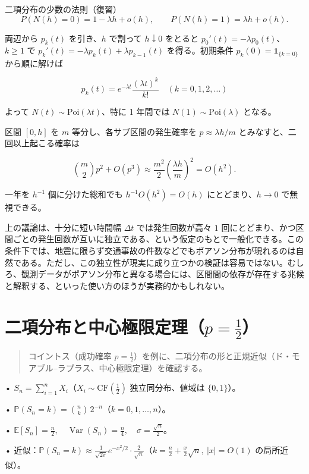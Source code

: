 \documentclass[uplatex,dvipdfmx,11pt,a4paper,openany]{bxjsbook}
\newenvironment{leadparagraph}{\begin{quote}\large\color{ColumnInk}}{\end{quote}}
\newcommand{\columnheading}[1]{\par\medskip{\large\color{ColumnInk}#1}\par\smallskip}
\begin{document}
\begin{columnbox}{二項分布の少数の法則（復習）}
\[P(N(h)=0)=1-\lambda h+o(h),\qquad P(N(h)=1)=\lambda h+o(h).\]

両辺から $p_k(t)$ を引き、$h$ で割って $h\downarrow 0$ をとると
        $p_0'(t)=-\lambda p_0(t)$、$k\ge 1$ で
        $p_k'(t)=-\lambda p_k(t)+\lambda p_{k-1}(t)$ を得る。初期条件 $p_k(0)=\mathbf{1}_{\{k=0\}}$ から順に解けば

\[p_k(t)=e^{-\lambda t}\frac{(\lambda t)^k}{k!}\quad(k=0,1,2,\dots)\]

よって $N(t)\sim \mathrm{Poi}(\lambda t)$、特に 1 年間では $N(1)\sim \mathrm{Poi}(\lambda)$ となる。

\columnheading{$P(N(h)\ge 2)=o(h)$ とおく直観}
区間 $[0,h]$ を $m$ 等分し、各サブ区間の発生確率を $p\approx \lambda h/m$ とみなすと、二回以上起こる確率は

\[\binom{m}{2}p^2+O(p^3)\approx \frac{m^2}{2}\left(\frac{\lambda h}{m}\right)^2=O(h^2).\]

一年を $h^{-1}$ 個に分けた総和でも $h^{-1}O(h^2)=O(h)$ にとどまり、$h\to 0$ で無視できる。

\columnheading{まとめ}
上の議論は、十分に短い時間幅 $\Delta t$ では発生回数が高々 $1$ 回にとどまり、かつ区間ごとの発生回数が互いに独立である、という仮定のもとで一般化できる。この条件下では、地震に限らず交通事故の件数などでもポアソン分布が現れるのは自然である。ただし、この独立性が現実に成り立つかの検証は容易ではない。むしろ、観測データがポアソン分布と異なる場合には、区間間の依存が存在する兆候と解釈する、といった使い方のほうが実務的かもしれない。

\end{columnbox}

\chapter{二項分布と中心極限定理（$p=\tfrac12$）}
\begin{leadparagraph}
コイントス（成功確率 $p=\tfrac12$）を例に、二項分布の形と正規近似（ド・モアブル–ラプラス、中心極限定理）を確認する。
\end{leadparagraph}

• $S_n=\sum_{i=1}^n X_i$（$X_i\sim \mathrm{CF}(\tfrac12)$ 独立同分布、値域は $\{0,1\}$）。

• $\displaystyle \mathbb P(S_n=k)=\binom{n}{k}\,2^{-n}$（$k=0,1,\dots,n$）。

• $\displaystyle \mathbb E[S_n]=\tfrac{n}{2},\quad \operatorname{Var}(S_n)=\tfrac{n}{4},\quad \sigma=\tfrac{\sqrt n}{2}$。

• 近似：$\displaystyle \mathbb P(S_n=k)\approx \frac{1}{\sqrt{2\pi}}e^{-x^2/2}\cdot \frac{2}{\sqrt n}$（$k=\tfrac{n}{2}+\tfrac{x}{2}\sqrt n,\ |x|=O(1)$ の局所近似）。
\end{document}
